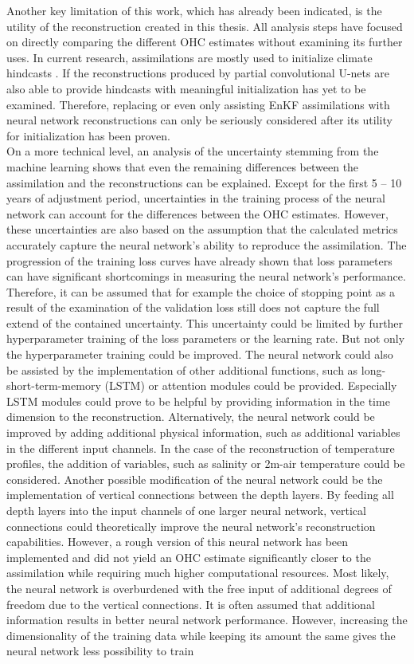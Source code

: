 \documentclass[Masterarbeit.tex]{subfile}
\begin{document}
	Another key limitation of this work, which has already been indicated, is the utility of the reconstruction created in this thesis. All analysis steps have focused on directly comparing the different OHC estimates without examining its further uses. In current research, assimilations are mostly used to initialize climate hindcasts \citep{brune_preserving_2020}. If the reconstructions produced by partial convolutional U-nets are also able to provide hindcasts with meaningful initialization has yet to be examined. Therefore, replacing or even only assisting EnKF assimilations with neural network reconstructions can only be seriously considered after its utility for initialization has been proven. \\
	On a more technical level, an analysis of the uncertainty stemming from the machine learning shows that even the remaining differences between the assimilation and the reconstructions can be explained. Except for the first 5 -- 10 years of adjustment period, uncertainties in the training process of the neural network can account for the differences between the OHC estimates. However, these uncertainties are also based on the assumption that the calculated metrics accurately capture the neural network's ability to reproduce the assimilation. The progression of the training loss curves have already shown that loss parameters can have significant shortcomings in measuring the neural network's performance. Therefore, it can be assumed that for example the choice of stopping point as a result of the examination of the validation loss still does not capture the full extend of the contained uncertainty. This uncertainty could be limited by further hyperparameter training of the loss parameters or the learning rate. But not only the hyperparameter training could be improved. The neural network could also be assisted by the implementation of other additional functions, such as long-short-term-memory (LSTM) or attention modules could be provided. Especially LSTM modules could prove to be helpful by providing information in the time dimension to the reconstruction. Alternatively, the neural network could be improved by adding additional physical information, such as additional variables in the different input channels. In the case of the reconstruction of temperature profiles, the addition of variables, such as salinity or 2m-air temperature could be considered. Another possible modification of the neural network could be the implementation of vertical connections between the depth layers. By feeding all depth layers into the input channels of one larger neural network, vertical connections could theoretically improve the neural network's reconstruction capabilities. However, a rough version of this neural network has been implemented and did not yield an OHC estimate significantly closer to the assimilation while requiring much higher computational resources. Most likely, the neural network is overburdened with the free input of additional degrees of freedom due to the vertical connections. It is often assumed that additional information results in better neural network performance. However, increasing the dimensionality of the training data while keeping its amount the same gives the neural network less possibility to train 
\end{document}
